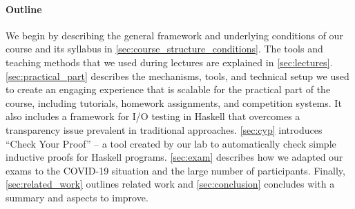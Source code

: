 \paragraph{Outline}

We begin by describing the general framework and underlying conditions of our course and its syllabus in \cref{sec:course_structure_conditions}.
The tools and teaching methods that we used during lectures are explained in \cref{sec:lectures}.
\cref{sec:practical_part} describes the
mechanisms, tools, and technical setup
we used to create an engaging experience
that is scalable
for the practical part of the course,
including tutorials, homework assignments, and
competition systems.
It also includes a framework for I/O
testing in Haskell
that overcomes a transparency issue prevalent in traditional approaches.
\cref{sec:cyp} introduces
``Check Your Proof'' -- a tool created
by our lab to automatically check simple inductive proofs for Haskell programs.
\cref{sec:exam} describes how we adapted our exams to the COVID-19 situation and the large number of participants.
Finally, \cref{sec:related_work} outlines related work
and \cref{sec:conclusion} concludes with a summary and aspects to improve.

